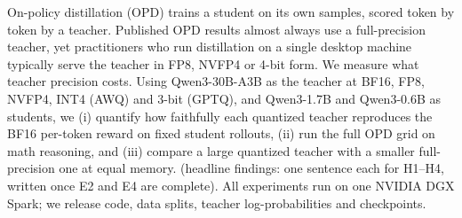 On-policy distillation (OPD) trains a student on its own samples, scored token by token by a
teacher. Published OPD results almost always use a full-precision teacher, yet practitioners
who run distillation on a single desktop machine typically serve the teacher in FP8, NVFP4 or
4-bit form. We measure what teacher precision costs. Using Qwen3-30B-A3B as the teacher at
BF16, FP8, NVFP4, INT4 (AWQ) and 3-bit (GPTQ), and Qwen3-1.7B and Qwen3-0.6B as students, we
(i) quantify how faithfully each quantized teacher reproduces the BF16 per-token reward on
fixed student rollouts, (ii) run the full OPD grid on math reasoning, and (iii) compare a large
quantized teacher with a smaller full-precision one at equal memory. \TBD{} (headline findings:
one sentence each for H1--H4, written once E2 and E4 are complete). All experiments run on one
NVIDIA DGX Spark; we release code, data splits, teacher log-probabilities and checkpoints.
